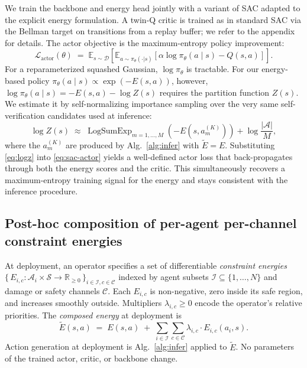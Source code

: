 \documentclass{article}
\begin{document}
We train the backbone and energy head jointly with a variant of SAC adapted to the explicit energy formulation.  A twin-Q critic is trained as in standard SAC via the Bellman target on transitions from a replay buffer; we refer to the appendix for details. The actor objective is the maximum-entropy policy improvement:
\begin{equation}
\mathcal{L}_\text{actor}(\theta) \;=\; \mathbb{E}_{s \sim \mathcal{D}}\!\left[\mathbb{E}_{a \sim \pi_\theta(\cdot|s)}\!\left[\alpha \log \pi_\theta(a \mid s) - Q(s, a)\right]\right].
\label{eq:sac-actor}
\end{equation}
For a reparameterized squashed Gaussian, $\log \pi_\theta$ is tractable. For our energy-based policy $\pi_\theta(a \mid s) \propto \exp(-E(s, a))$, however, $\log \pi_\theta(a \mid s) = -E(s, a) - \log Z(s)$ requires the partition function $Z(s)$. We estimate it by self-normalizing importance sampling over the very same self-verification candidates used at inference:
\begin{equation}
\log Z(s) \;\approx\; \operatorname{LogSumExp}_{m = 1, \ldots, M}\!\left(-E\!\left(s, a_m^{(K)}\right)\right) + \log\frac{|\mathcal{A}|}{M},
\label{eq:logz}
\end{equation}
where the $a_m^{(K)}$ are produced by Alg.~\ref{alg:infer} with $\widetilde E = E$. Substituting \eqref{eq:logz} into \eqref{eq:sac-actor} yields a well-defined actor loss that back-propagates through both the energy scores and the critic. This simultaneously recovers a maximum-entropy training signal for the energy and stays consistent with the inference procedure.

\subsection{Post-hoc composition of per-agent per-channel constraint energies}
\label{sec:method:composition}

At deployment, an operator specifies a set of differentiable \emph{constraint energies}
$\bigl\{\,E_{i,c}: \mathcal{A}_i \times \mathcal{S} \to \mathbb{R}_{\geq 0}\,\bigr\}_{i \in \mathcal{I}, c \in \mathcal{C}}$
indexed by agent subsets $\mathcal{I} \subseteq \{1, \ldots, N\}$ and damage or safety channels $\mathcal{C}$. Each $E_{i,c}$ is non-negative, zero inside its safe region, and increases smoothly outside. Multipliers $\lambda_{i,c} \geq 0$ encode the operator's relative priorities. The \emph{composed energy} at deployment is
\begin{equation}
\widetilde E(s, a) \;=\; E(s, a) \;+\; \sum_{i \in \mathcal{I}} \sum_{c \in \mathcal{C}} \lambda_{i,c} \cdot E_{i,c}(a_i, s).
\label{eq:composition}
\end{equation}
Action generation at deployment is Alg.~\ref{alg:infer} applied to $\widetilde E$. No parameters of the trained actor, critic, or backbone change.
\end{document}
